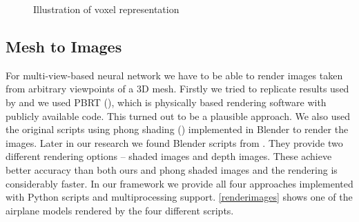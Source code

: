 \begin{figure}[!h]
	\centering
	\qquad
	\caption{Illustration of voxel representation}
\end{figure}

\subsection{Mesh to Images}
\label{subsec:meshtoimgs}
For multi-view-based neural network we have to be able to render images taken from arbitrary viewpoints of a 3D mesh. Firstly we tried to replicate results used by \cite{su_multi-view_2015} and we used PBRT (\cite{pharr_physically_2010}), which is physically based rendering software with publicly available code. This turned out to be a plausible approach. We also used the original scripts using phong shading (\cite{bishop_fast_1986}) implemented in Blender to render the images.
Later in our research we found Blender scripts from \cite{su_deeper_2018}. They provide two different rendering options -- shaded images and depth images. These achieve better accuracy than both ours and phong shaded images and the rendering is considerably faster. In our framework we provide all four approaches implemented with Python scripts and multiprocessing support. \autoref{renderimages} shows one of the airplane models rendered by the four different scripts.

